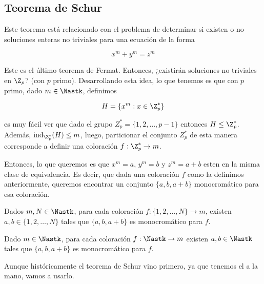 \subsection{Teorema de Schur}

Este teorema está relacionado con el problema de determinar si existen o no soluciones enteras no triviales para una ecuación de la forma

\[
x^m + y^m = z^m
\]

Este es el último teorema de Fermat. Entonces, ¿existirán soluciones no triviales en $\Z_p$? (con $p$ primo). Desarrollando esta idea, lo que tenemos es que con $p$ primo, dado $m \in \Nastk$, definimos 

\[
H = \{x^m : x \in \Z_p^*\}
\]

\noindent es muy fácil ver que dado el grupo $Z_p^* = \{ 1, 2, \dots, p-1 \}$ entonces $H \leq \Z_p^*$. Además, $\operatorname{ind}_{\Z_p^*}(H) \leq m$, luego, particionar el conjunto $Z_p^*$ de esta manera corresponde a definir una coloración $f: \Z_p^* \rightarrow m$.

Entonces, lo que queremos es que $x^m = a$, $y^m = b$ y $z^m = a + b$ esten en la misma clase de equivalencia. Es decir, que dada una coloración $f$ como la definimos anteriormente, queremos encontrar un conjunto $\{a, b, a+b\}$ monocromático para esa coloración.

\begin{teo}
    Dados $m, N \in \Nastk$, para cada coloración $f: \{1, 2, \dots, N\} \rightarrow m$, existen $a, b \in \{1, 2, \dots, N\}$ tales que $\{a, b, a+b\}$ es monocromático para $f$.
\end{teo}

\begin{teo}[Schur]\label{teo:Schur}
    Dado $m \in \Nastk$, para cada coloración $f: \Nastk \rightarrow m$ existen $a, b \in \Nastk$ tales que $\{a, b, a+b\}$ es monocromático para $f$.
\end{teo}

Aunque históricamente el teorema de Schur vino primero, ya que tenemos el  a la mano, vamos a usarlo.

